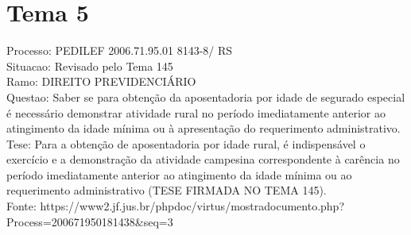 \documentclass[12pt]{article}
\begin{document}
\section*{Tema 5}
Processo: PEDILEF 2006.71.95.01 8143-8/ RS\\
Situacao: Revisado pelo Tema 145\\
Ramo: DIREITO PREVIDENCIÁRIO\\
Questao: Saber se para obtenção da aposentadoria por idade de segurado especial é necessário demonstrar atividade rural no período imediatamente anterior ao atingimento da idade mínima ou à apresentação do requerimento administrativo.\\
Tese: Para a obtenção de aposentadoria por idade rural, é indispensável o exercício e a demonstração da atividade campesina correspondente à carência no período imediatamente anterior ao atingimento da idade mínima ou ao requerimento administrativo (TESE FIRMADA NO TEMA 145).\\
Fonte: https://www2.jf.jus.br/phpdoc/virtus/mostradocumento.php?Process=200671950181438\&seq=3
\end{document}
